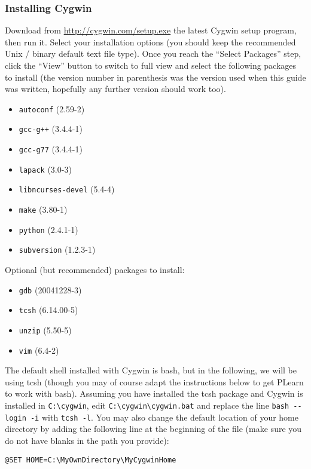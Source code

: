 \documentclass[11pt]{book}
\begin{document}
\subsubsection{Installing Cygwin}

Download from \url{http://cygwin.com/setup.exe} the latest Cygwin setup program,
then run it.
Select your installation options (you should keep the recommended Unix / binary default
text file type).
Once you reach the ``Select Packages'' step, click the ``View'' button to switch
to full view and select the following packages to install (the version number in
parenthesis was the version used when this guide was written, hopefully any further
version should work too).

\begin{itemize}
\item \verb!autoconf! (2.59-2)
\item \verb!gcc-g++! (3.4.4-1)
\item \verb!gcc-g77! (3.4.4-1)
\item \verb!lapack! (3.0-3)
\item \verb!libncurses-devel! (5.4-4)
\item \verb!make! (3.80-1)
\item \verb!python! (2.4.1-1)
\item \verb!subversion! (1.2.3-1)
\end{itemize}

Optional (but recommended) packages to install:
\begin{itemize}
\item \verb!gdb! (20041228-3)
\item \verb!tcsh! (6.14.00-5)
\item \verb!unzip! (5.50-5)
\item \verb!vim! (6.4-2)
\end{itemize}

The default shell installed with Cygwin is bash, but in the following, we will
be using tcsh (though you may of course adapt the instructions below to get PLearn to
work with bash). Assuming you have installed the tcsh package and Cygwin is
installed in \verb!C:\cygwin!, edit \verb!C:\cygwin\cygwin.bat! and replace
the line \verb!bash --login -i! with \verb!tcsh -l!.
You may also change the default location of your home directory by adding the
following line at the beginning of the file (make sure you do not have blanks
in the path you provide):
\begin{verbatim}
@SET HOME=C:\MyOwnDirectory\MyCygwinHome
\end{verbatim}
\end{document}
